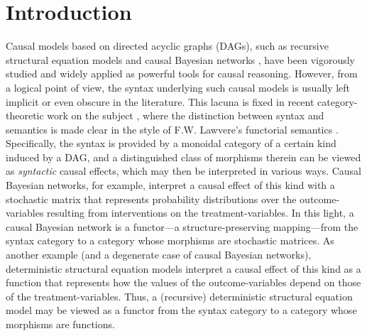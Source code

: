 \documentclass[12pt]{amsart}
\theoremstyle{plain}
\theoremstyle{definition}
\theoremstyle{remark}
\numberwithin{equation}{section}
\theoremstyle{plain}
\newcommand{\0}{\emptyset}
\begin{document}
\clearpage

\section{Introduction}
\label{sec:intro}

Causal models based on directed acyclic graphs (DAGs), such as recursive structural equation models \cite{GallesPearl1998, Halpern2000} and causal Bayesian networks \cite{SGS2000, pearl2009causality},  have been vigorously studied and widely applied as powerful tools for causal reasoning.  However,  from a logical point of view,  the syntax underlying such causal models is usually left implicit or even obscure in the literature.  This lacuna is fixed in recent category-theoretic work on the subject \cite{Fong:thesis, jacobs2019causal}, where the distinction between syntax and semantics is made clear in the style of F.W. Lawvere's functorial semantics \cite{lawvere1963functorial}. Specifically, the syntax is provided by a monoidal category of a certain kind induced by a DAG, and a distinguished class of morphisms therein can be viewed as {\it syntactic} causal effects, which may then be interpreted in various ways. Causal Bayesian networks, for example, interpret a causal effect of this kind with a stochastic matrix that represents probability distributions over the outcome-variables resulting from interventions on the treatment-variables. In this light, a causal Bayesian network is a functor---a structure-preserving mapping---from the syntax category to a category whose morphisms are stochastic matrices. As another example (and a degenerate case of causal Bayesian networks), deterministic structural equation models interpret a causal effect of this kind as a function that represents how the values of the outcome-variables depend on those of the treatment-variables. Thus, a (recursive) deterministic structural equation model may be viewed as a functor from the syntax category to a category whose morphisms are functions.
\end{document}
